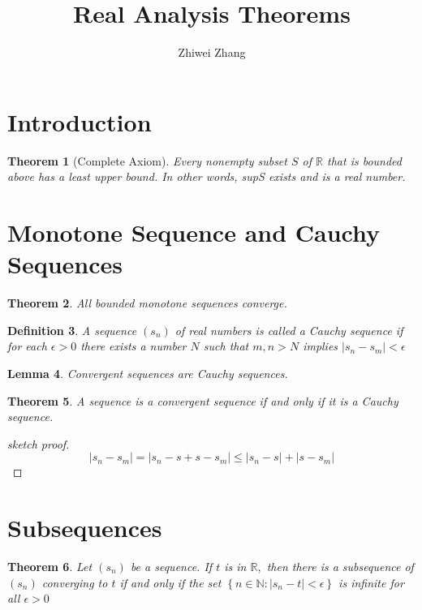 \documentclass[12pt]{article}
\newtheorem{theorem}{Theorem}[section]
\newtheorem{lemma}[theorem]{Lemma}
\newtheorem{definition}[theorem]{Definition}
\begin{document}
 
 
 
\title{Real Analysis Theorems}
\author{Zhiwei Zhang}
 
\maketitle

\section{Introduction}
\begin{theorem}[Complete Axiom]
	Every nonempty subset $S$ of $\mathbb { R }$ that is bounded above has a least upper
	bound. In other words, supS exists and is a real number.
\end{theorem}

\section{Monotone Sequence and Cauchy Sequences}
\begin{theorem}
	All bounded monotone sequences converge.
\end{theorem}
\begin{definition}
	A sequence $\left( s _ { n } \right)$ of real numbers is called a Cauchy sequence if
	for each $\epsilon > 0$ there exists a number $N$ such that
	$m , n > N$ implies $\left| s _ { n } - s _ { m } \right| < \epsilon$
\end{definition}
\begin{lemma}
	Convergent sequences are Cauchy sequences.
\end{lemma}

\begin{theorem}
	A sequence is a convergent sequence if and only if it is a Cauchy sequence.
\end{theorem}
\begin{proof}[sketch proof]$$
	\left| s _ { n } - s _ { m } \right| = \left| s _ { n } - s + s - s _ { m } \right| \leq \left| s _ { n } - s \right| + \left| s - s _ { m } \right|
	$$
\end{proof}

\section{Subsequences}
\begin{theorem}
	Let $(s_n)$ be a sequence. If $t$ is in $\mathbb { R } ,$ then there is a subsequence of $\left( s _ { n } \right)$ converging to $t$
	if and only if the set $\left\{ n \in \mathbb { N } : \left| s _ { n } - t \right| < \epsilon \right\}$ is infinite for all
	$\epsilon > 0$
\end{theorem}
\end{document}
